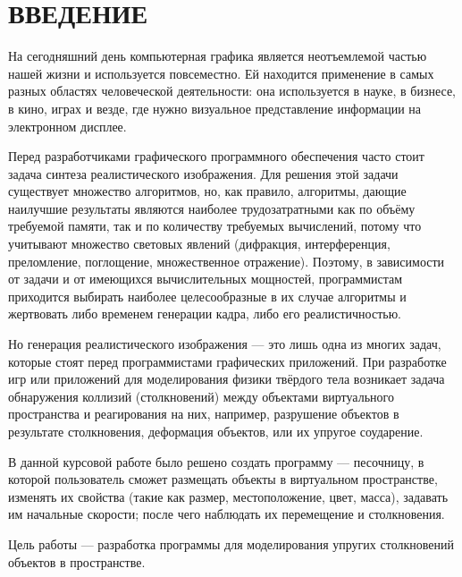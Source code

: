 \section*{ВВЕДЕНИЕ}

На сегодняшний день компьютерная графика является неотъемлемой частью нашей жизни и используется повсеместно.
Ей находится применение в самых разных областях человеческой деятельности: она используется в науке, в бизнесе, в кино, играх и везде, где нужно визуальное представление информации на электронном дисплее.

Перед разработчиками графического программного обеспечения часто стоит задача синтеза реалистического изображения.
Для решения этой задачи существует множество алгоритмов, но, как правило, алгоритмы, дающие наилучшие результаты являются наиболее трудозатратными как по объёму требуемой памяти, так и по количеству требуемых вычислений, потому что учитывают множество световых явлений (дифракция, интерференция, преломление, поглощение, множественное отражение).
Поэтому, в зависимости от задачи и от имеющихся вычислительных мощностей, программистам приходится выбирать наиболее целесообразные в их случае алгоритмы и жертвовать либо временем генерации кадра, либо его реалистичностью.

Но генерация реалистического изображения --- это лишь одна из многих задач, которые стоят перед программистами графических приложений.
При разработке игр или приложений для моделирования физики твёрдого тела возникает задача обнаружения коллизий (столкновений) между объектами виртуального пространства и реагирования на них, например, разрушение объектов в результате столкновения, деформация объектов, или их упругое соударение.

В данной курсовой работе было решено создать программу --- песочницу, в которой пользователь сможет размещать объекты в виртуальном пространстве, изменять их свойства (такие как размер, местоположение, цвет, масса), задавать им начальные скорости; после чего наблюдать их перемещение и столкновения.

Цель работы --- разработка программы для моделирования упругих столкновений объектов в пространстве.


